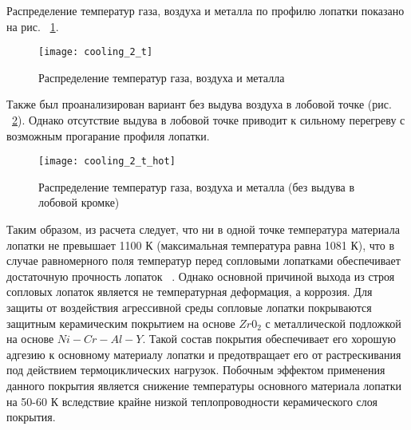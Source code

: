 Распределение температур газа, воздуха и металла по профилю лопатки показано на рис. ~\ref{img:cool_gas_parameters_front}.
\begin{figure}[H]
    \centering
	\texttt{[image: cooling\_2\_t]}
	\caption{Распределение температур газа, воздуха и металла}
	\label{img:cool_gas_parameters_front}
\end{figure}

Также был проанализирован вариант без выдува воздуха в лобовой точке (рис. ~\ref{img:cool_gas_parameters_no_front}).
Однако отсутствие выдува в лобовой точке приводит к сильному перегреву с возможным прогарание профиля лопатки.
\begin{figure}[H]
    \centering
	\texttt{[image: cooling\_2\_t\_hot]}
	\caption{Распределение температур газа, воздуха и металла (без выдува в лобовой кромке)}
	\label{img:cool_gas_parameters_no_front}
\end{figure}

Таким образом, из расчета следует, что ни в одной точке температура материала лопатки не превышает 1100 К (максимальная температура
равна 1081 К), что в случае равномерного поля температур перед сопловыми лопатками обеспечивает достаточную прочность лопаток
~\cite{js_36_properties}.
Однако основной причиной выхода из строя сопловых лопаток является не температурная деформация, а коррозия.
Для защиты от воздействия агрессивной среды сопловые лопатки покрываются защитным керамическим покрытием на основе
$Zr0_2$ с металлической подложкой на основе $Ni-Cr-Al-Y$. Такой состав покрытия обеспечивает его хорошую адгезию к
основному материалу лопатки и предотвращает его от растрескивания под действием термоциклических нагрузок.
Побочным эффектом применения данного покрытия является снижение температуры основного материала лопатки на 50-60 К
вследствие крайне низкой теплопроводности керамического слоя покрытия.

